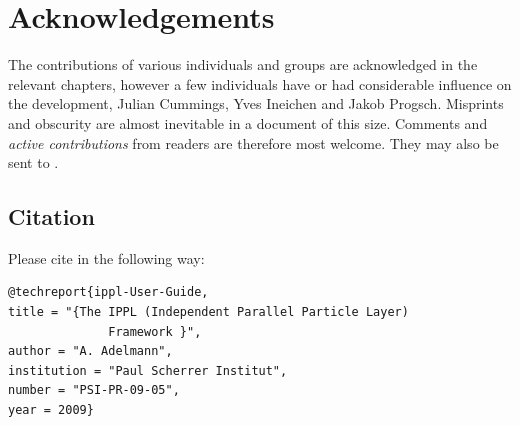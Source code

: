 \clearpage
\section{Acknowledgements}
The contributions of various individuals and groups are acknowledged in the relevant chapters, 
however a few individuals have or had considerable influence on the 
development, Julian Cummings, Yves Ineichen and Jakob Progsch.
Misprints and obscurity are almost inevitable in a document of this size.
Comments and {\em active contributions}  from readers are therefore most welcome.
They may also be sent to .

\subsection{Citation}
Please cite \ippl in the following way:
\begin{small}
\begin{verbatim} 
@techreport{ippl-User-Guide,
title = "{The IPPL (Independent Parallel Particle Layer)
              Framework }",
author = "A. Adelmann",
institution = "Paul Scherrer Institut",
number = "PSI-PR-09-05",
year = 2009}
\end{verbatim}
\end{small}




